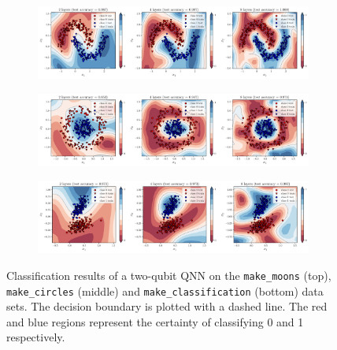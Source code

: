 \documentclass[a4paper,10pt]{article}
\begin{document}
\begin{appendices}
	\begin{figure}[ht]
		\centering
		\begin{subfigure}{1\textwidth}
			\centering
			\includegraphics[width=1\linewidth]{figures/qnn_moons_classification.pdf}
		\end{subfigure}
		\begin{subfigure}{1\textwidth}
			\centering
			\includegraphics[width=1\linewidth]{figures/qnn_circles_classification.pdf}
		\end{subfigure}
		\begin{subfigure}{1\textwidth}
			\centering
			\includegraphics[width=1\linewidth]{figures/qnn_linear_classification.pdf}
		\end{subfigure}
		\cprotect\caption{Classification results of a two-qubit QNN on the \verb|make_moons| (top), \verb|make_circles| (middle) and \verb|make_classification| (bottom) data sets. The decision boundary is plotted with a dashed line. The red and blue regions represent the certainty of classifying 0 and 1 respectively.}
		\label{fig:classification_decision_regions}
	\end{figure}
\end{appendices}
\end{document}
